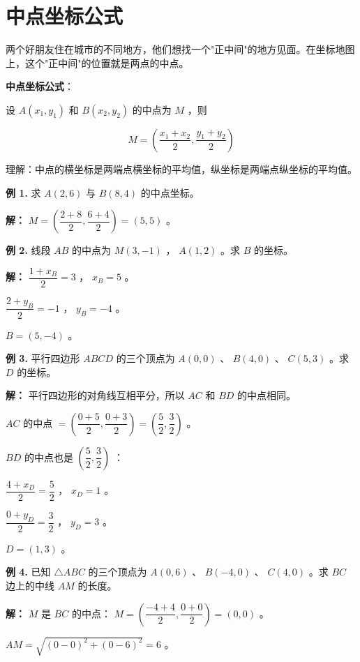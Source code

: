 \section*{中点坐标公式}


\begin{explore}


两个好朋友住在城市的不同地方，他们想找一个"正中间"的地方见面。在坐标地图上，这个"正中间"的位置就是两点的中点。

\end{explore}

\begin{understand}


\textbf{中点坐标公式}：

设 $A(x_1, y_1)$ 和 $B(x_2, y_2)$ 的中点为 $M$ ，则

\[
M = \left(\frac{x_1 + x_2}{2}, \frac{y_1 + y_2}{2}\right)
\]


理解：中点的横坐标是两端点横坐标的平均值，纵坐标是两端点纵坐标的平均值。

\end{understand}

\begin{workedexamples}


\textbf{例 1.} 求 $A(2, 6)$ 与 $B(8, 4)$ 的中点坐标。

\textbf{解：}
$M = \left(\dfrac{2+8}{2}, \dfrac{6+4}{2}\right) = (5, 5)$ 。

\textbf{例 2.} 线段 $AB$ 的中点为 $M(3, -1)$ ， $A(1, 2)$ 。求 $B$ 的坐标。

\textbf{解：}
$\dfrac{1 + x_B}{2} = 3$ ， $x_B = 5$ 。

$\dfrac{2 + y_B}{2} = -1$ ， $y_B = -4$ 。

$B = (5, -4)$ 。

\textbf{例 3.} 平行四边形 $ABCD$ 的三个顶点为 $A(0, 0)$ 、 $B(4, 0)$ 、 $C(5, 3)$ 。求 $D$ 的坐标。

\textbf{解：}
平行四边形的对角线互相平分，所以 $AC$ 和 $BD$ 的中点相同。

$AC$ 的中点 $= \left(\dfrac{0+5}{2}, \dfrac{0+3}{2}\right) = \left(\dfrac{5}{2}, \dfrac{3}{2}\right)$ 。

$BD$ 的中点也是 $\left(\dfrac{5}{2}, \dfrac{3}{2}\right)$ ：

$\dfrac{4 + x_D}{2} = \dfrac{5}{2}$ ， $x_D = 1$ 。

$\dfrac{0 + y_D}{2} = \dfrac{3}{2}$ ， $y_D = 3$ 。

$D = (1, 3)$ 。

\textbf{例 4.} 已知 $\triangle ABC$ 的三个顶点为 $A(0, 6)$ 、 $B(-4, 0)$ 、 $C(4, 0)$ 。求 $BC$ 边上的中线 $AM$ 的长度。

\textbf{解：}
$M$ 是 $BC$ 的中点： $M = \left(\dfrac{-4+4}{2}, \dfrac{0+0}{2}\right) = (0, 0)$ 。

$AM = \sqrt{(0-0)^2 + (0-6)^2} = 6$ 。

\end{workedexamples}

